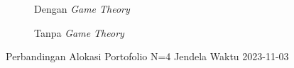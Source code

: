 %         
% 
% 
%         
% 
% 

\begin{figure}[!htbp]
    \centering
    \begin{subfigure}[b]{0.48\textwidth}
        \centering
        


        \caption{Dengan \textit{Game Theory}}
    \end{subfigure}
    \hfill
    \begin{subfigure}[b]{0.48\textwidth}
        \centering
        


        \caption{Tanpa \textit{Game Theory}}
    \end{subfigure}
    \caption{Perbandingan Alokasi Portofolio N=4 Jendela Waktu 2023-11-03}
    \label{fig:window_n4_2023_11_03}
\end{figure}

%         
% 
% 
%         
% 
% 
